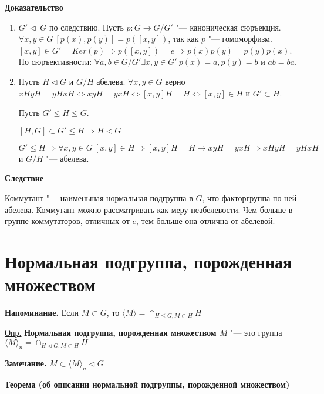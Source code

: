 \documentclass{article}
\begin{document}
\textbf{Доказательство}
\begin{enumerate}
	\item $G' \triangleleft \  G$ по следствию. Пусть $p: G \rightarrow G/G'$ "--- каноническая сюръекция. $\forall x, y \in G \  [p(x), p(y)] = p([x, y])$, так как $p$ "--- гомоморфизм. $[x, y] \in G' = Ker(p) \Rightarrow p([x, y]) = e \Rightarrow p(x)p(y) = p(y)p(x)$. По сюръективности: $\forall a, b \in G/G' \exists x, y \in G' \  p(x) = a, p(y) = b$ и $ab = ba$.
	
	\item Пусть $H \triangleleft G$ и $G/H$ абелева. $\forall x, y \in G$ верно $xHyH = yHxH \Leftrightarrow xyH = yxH \Leftrightarrow [x, y]H = H \Leftrightarrow [x,y] \in H$ и $G' \subset H$.
	
	Пусть $G' \leq H \leq G$.
	
	$[H, G] \subset G' \leq H \Rightarrow H \triangleleft G$
	
	$G' \leq H \Rightarrow \forall x, y \in G \  [x, y] \in H \Rightarrow [x, y]H = H \rightarrow xyH = yxH  \Rightarrow xHyH = yHxH$ и $G/H$ "--- абелева.
\end{enumerate}

\vspace{10pt}

\textbf{Следствие}

Коммутант "--- наименьшая нормальная подгруппа в $G$, что факторгруппа по ней абелева. Коммутант можно рассматривать как меру неабелевости. Чем больше в группе коммутаторов, отличных от $e$, тем больше она отлична от абелевой.

\section{Нормальная подгруппа, порожденная множеством}

\textbf{Напоминание.} Если $M \subset G$, то $\langle M \rangle = \cap_{H \leq G, M \subset H} H$

\vspace{5pt}

\underline{Опр.} \textbf{Нормальная подгруппа, порожденная множеством $M$} "--- это группа $\langle M \rangle_{n} = \cap_{H \triangleleft G, M \subset H} H$

\vspace{5pt}

\textbf{Замечание.}
$M \subset \langle M \rangle_n \triangleleft G$

\textbf{Теорема (об описании нормальной подгруппы, порожденной множеством)}
\end{document}
